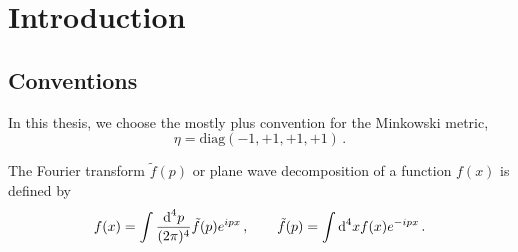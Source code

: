 \chapter{Introduction}

\section{Conventions}

In this thesis, we choose the mostly plus convention for the Minkowski metric,
\begin{equation}
    \eta=\text{diag}(-1,+1,+1,+1)\,.
\end{equation}

The Fourier transform $\tilde{f}(p)$ or plane wave decomposition of a function $f(x)$ is defined by
\begin{equation}
    f(x)=\int\frac{\text{d}^4p}{(2\pi)^4}\tilde{f}(p)e^{{i} px}\,,\qquad \tilde{f}(p)=\int\text{d}^4x f(x)e^{-{i} px}\,.
\end{equation}
